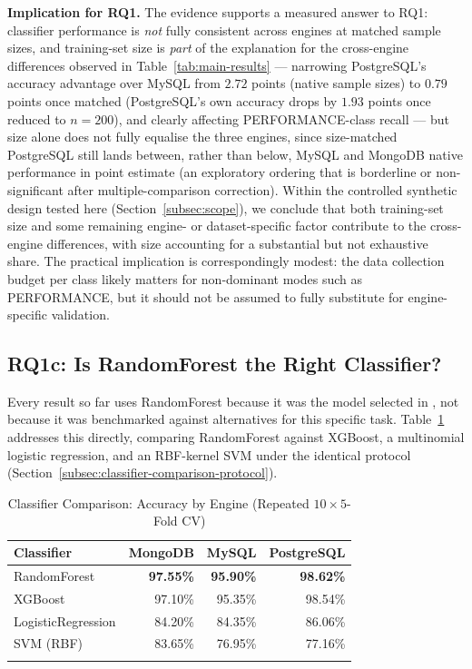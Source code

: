 \documentclass[iicol,pdflatex,sn-mathphys-num]{sn-jnl}
\theoremstyle{thmstyleone}
\theoremstyle{thmstylethree}
\begin{document}
\textbf{Implication for RQ1.} The evidence supports a measured answer
to RQ1: classifier performance is \emph{not} fully consistent
across engines at matched sample sizes, and training-set size is
\emph{part} of the explanation for the cross-engine differences
observed in Table~\ref{tab:main-results} --- narrowing PostgreSQL's
accuracy advantage over MySQL from $2.72$ points (native sample sizes)
to $0.79$ points once matched (PostgreSQL's own accuracy drops by
$1.93$ points once reduced to $n=200$), and clearly affecting
PERFORMANCE-class recall --- but size
alone does not fully equalise the three engines, since size-matched
PostgreSQL still lands between, rather than below, MySQL and MongoDB
native performance in point estimate (an exploratory ordering that is
borderline or non-significant after multiple-comparison correction).
Within the controlled synthetic design tested
here (Section~\ref{subsec:scope}), we conclude that both training-set
size and some remaining engine- or dataset-specific factor contribute
to the cross-engine differences, with size accounting for a
substantial but not exhaustive share. The practical implication is
correspondingly modest: the data collection budget per class
likely matters for non-dominant modes such as PERFORMANCE, but it
should not be assumed to fully substitute for engine-specific
validation.

\subsection{RQ1c: Is RandomForest the Right Classifier?}\label{subsec:rq1c}

Every result so far uses RandomForest because it was the model
selected in \cite{iaha2026}, not because it was benchmarked against
alternatives for this specific task. Table~\ref{tab:classifier-comparison}
addresses this directly, comparing RandomForest against XGBoost, a
multinomial logistic regression, and an RBF-kernel SVM under the
identical protocol (Section~\ref{subsec:classifier-comparison-protocol}).

\begin{table}[h]
\caption{Classifier Comparison: Accuracy by Engine (Repeated $10\times5$-Fold CV)}\label{tab:classifier-comparison}
\begin{tabular}{@{}lrrr@{}}
\toprule
Classifier & MongoDB & MySQL & PostgreSQL \\
\midrule
RandomForest        & \textbf{97.55\%} & \textbf{95.90\%} & \textbf{98.62\%} \\
XGBoost              & 97.10\% & 95.35\% & 98.54\% \\
LogisticRegression   & 84.20\% & 84.35\% & 86.06\% \\
SVM (RBF)            & 83.65\% & 76.95\% & 77.16\% \\
\botrule
\end{tabular}
\end{table}
\end{document}
